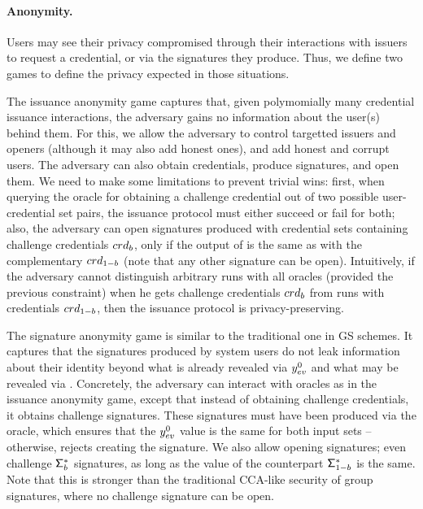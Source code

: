 
\paragraph{Anonymity.} %
Users may see their privacy compromised through their interactions with issuers
to request a credential, or via the signatures they produce. Thus, we define two
games to define the privacy expected in those situations.

The issuance anonymity game captures that, given polymomially many
credential issuance interactions, the adversary gains no information about the
user(s) behind them. For this, we allow the adversary to control targetted
issuers and openers (although it may also add honest ones), and add honest and
corrupt users. The adversary can also obtain credentials, produce signatures,
and open them. We need to make some limitations to prevent trivial wins: first,
when querying the oracle for obtaining a challenge credential out of two
possible user-credential set pairs, the issuance protocol must either succeed or
fail for both; also, the adversary can open signatures produced with credential
sets containing challenge credentials $crd_b$, only if the output of \Open is
the same as with the complementary $crd_{1-b}$ (note that any other signature
can be open).
Intuitively, if the adversary cannot distinguish arbitrary runs with all oracles
(provided the previous constraint) when he gets challenge credentials $crd_b$
from runs with credentials $crd_{1-b}$, then the issuance protocol is
privacy-preserving.

The signature anonymity game is similar to the traditional one in GS schemes.
It captures that the signatures produced by system users do not leak information
about their identity beyond what is already revealed via $y_{ev}^0$ and what
may be revealed via \yinsp. Concretely, the adversary can interact with oracles
as in the issuance anonymity game, except that instead of obtaining challenge
credentials, it obtains challenge signatures. These signatures must have been
produced via the \CHALb oracle, which ensures that the $y_{ev}^0$ value is the
same for both input sets -- otherwise, rejects creating the signature. We also
allow opening signatures; even challenge $\mathsf{\Sigma}^*_b$ signatures, as long as the
\yinsp value of the counterpart $\mathsf{\Sigma}^*_{1-b}$ is the same. Note that this is
stronger than the traditional CCA-like security of group signatures, where no
challenge signature can be open.


